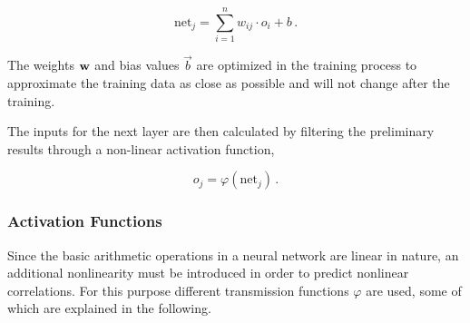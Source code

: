 		\begin{equation}
			\label{eq:perceptron_simple}
			\text{net}_j = \sum_{i=1}^{n} w_{ij} \cdot o_i + b \, . 
		\end{equation}
		
		The weights $\mathbf{w}$ and bias values $\vec{b}$ are optimized in the training process to approximate the training data as close as possible and will not change after the training.
		
		
		The inputs for the next layer are then calculated by filtering the preliminary results through a non-linear activation function,
		
		\begin{equation}
		\label{eq:perceptron_act}
		o_j = \varphi\left(\text{net}_j\right) \, . 
		\end{equation}
		

		
		 
		\subsubsection { Activation Functions }
		Since the basic arithmetic operations in a neural network are linear in nature, an additional nonlinearity must be introduced in order to predict nonlinear correlations. 
		For this purpose different transmission functions $\varphi$ are used, some of which are explained in the following.\\

